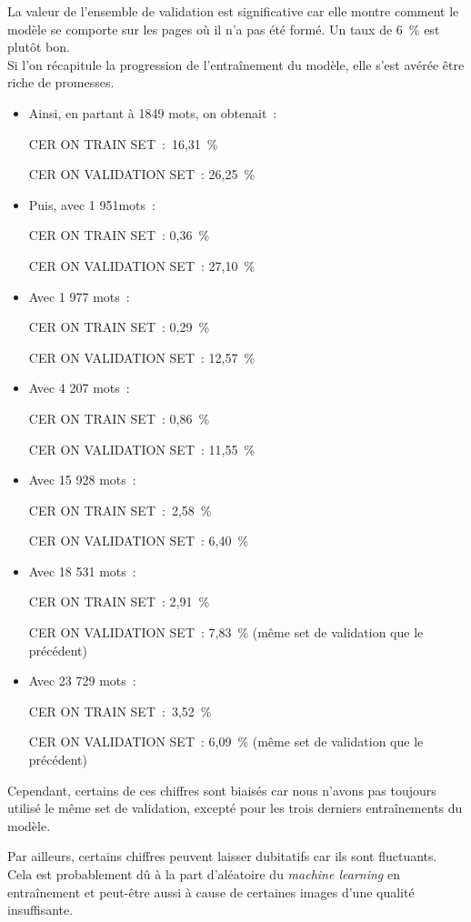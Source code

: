 La valeur de l'ensemble de validation est significative car elle montre comment le modèle se comporte sur les pages où il n'a pas été formé. Un taux de 6~\% est plutôt bon.\\

Si l'on récapitule la progression de l'entraînement du modèle, elle  s’est avérée être riche de promesses. 
\begin{itemize}
    \item Ainsi, en partant à 1849 mots, on obtenait :

CER ON TRAIN SET :~16,31 \%

CER ON VALIDATION SET : 26,25 \%
\item Puis, avec 1 951mots :

CER ON TRAIN SET~: 0,36 \%

CER ON VALIDATION SET : 27,10 \%

\item Avec 1 977 mots :

CER ON TRAIN SET : 0,29 \%

CER ON VALIDATION SET : 12,57 \%

\item Avec 4 207 mots :

CER ON TRAIN SET : 0,86 \%

CER ON VALIDATION SET : 11,55 \%

\item Avec 15 928 mots :

CER ON TRAIN SET~:~2,58 \%

CER ON VALIDATION SET : 6,40 \%

\item Avec 18 531 mots :

CER ON TRAIN SET : 2,91 \%

CER ON VALIDATION SET : 7,83 \% (même set de validation que le précédent)

\item Avec 23 729 mots :

CER ON TRAIN SET~:~3,52 \%

CER ON VALIDATION SET : 6,09 \% (même set de validation que le précédent)

\end{itemize}

Cependant, certains de ces chiffres sont biaisés car nous n'avons pas toujours utilisé le même set de validation, excepté pour les trois derniers entraînements du modèle. 

Par ailleurs, certains chiffres peuvent laisser dubitatifs car ils sont fluctuants. Cela est probablement dû à la part d’aléatoire du \emph{machine learning} en entraînement et peut-être aussi à cause de certaines images d'une qualité insuffisante.


